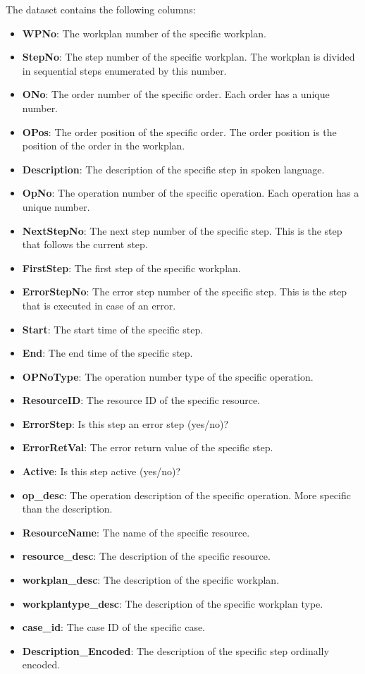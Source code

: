 The dataset contains the following columns:

\begin{itemize}
  \item \textbf{WPNo}: The workplan number of the specific workplan.
  \item \textbf{StepNo}: The step number of the specific workplan. The workplan is divided in sequential steps enumerated by this number.
  \item \textbf{ONo}: The order number of the specific order. Each order has a unique number.
  \item \textbf{OPos}: The order position of the specific order. The order position is the position of the order in the workplan.
  \item \textbf{Description}: The description of the specific step in spoken language.
  \item \textbf{OpNo}: The operation number of the specific operation. Each operation has a unique number.
  \item \textbf{NextStepNo}: The next step number of the specific step. This is the step that follows the current step.
  \item \textbf{FirstStep}: The first step of the specific workplan.
  \item \textbf{ErrorStepNo}: The error step number of the specific step. This is the step that is executed in case of an error.
  \item \textbf{Start}: The start time of the specific step.
  \item \textbf{End}: The end time of the specific step.
  \item \textbf{OPNoType}: The operation number type of the specific operation.
  \item \textbf{ResourceID}: The resource ID of the specific resource.
  \item \textbf{ErrorStep}: Is this step an error step (yes/no)?
  \item \textbf{ErrorRetVal}: The error return value of the specific step.
  \item \textbf{Active}: Is this step active (yes/no)?
  \item \textbf{op\_desc}: The operation description of the specific operation. More specific than the description.
  \item \textbf{ResourceName}: The name of the specific resource.
  \item \textbf{resource\_desc}: The description of the specific resource.
  \item \textbf{workplan\_desc}: The description of the specific workplan.
  \item \textbf{workplantype\_desc}: The description of the specific workplan type.
  \item \textbf{case\_id}: The case ID of the specific case.
  \item \textbf{Description\_Encoded}: The description of the specific step ordinally encoded.
\end{itemize}

